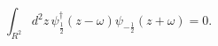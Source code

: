 \begin{equation}
\int_{R^2}d^2z\,
\psi_{\frac{1}{2}}^\dagger(z-\omega)
\psi_{-\frac{1}{2}}(z+\omega)=0.\end{equation}

